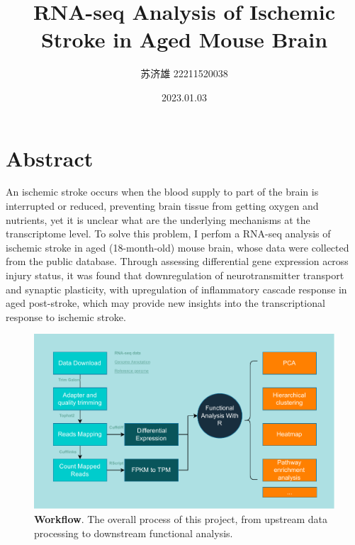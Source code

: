 \documentclass[
  a4paper,
]{article}
\title{RNA-seq Analysis of Ischemic Stroke in Aged Mouse Brain}
\author{苏济雄 22211520038}
\date{2023.01.03}
\renewcommand*\contentsname{Table of contents}
\newcommand\contentsname{Table of contents}
\begin{document}
\maketitle
\ifdefined\Shaded\renewenvironment{Shaded}{\begin{tcolorbox}[colback={shadecolor}, boxrule=0pt, breakable, frame hidden, enhanced]}{\end{tcolorbox}}\fi

\renewcommand*\contentsname{Contents}
{
\hypersetup{linkcolor=}
\setcounter{tocdepth}{3}
\tableofcontents
}
\hypertarget{abstract}{%
\section{Abstract}\label{abstract}}

An ischemic stroke occurs when the blood supply to part of the brain is
interrupted or reduced, preventing brain tissue from getting oxygen and
nutrients, yet it is unclear what are the underlying mechanisms at the
transcriptome level. To solve this problem, I perfom a RNA-seq analysis
of ischemic stroke in aged (18-month-old) mouse brain, whose data were
collected from the public database. Through assessing differential gene
expression across injury status, it was found that downregulation of
neurotransmitter transport and synaptic plasticity, with upregulation of
inflammatory cascade response in aged post-stroke, which may provide new
insights into the transcriptional response to ischemic stroke.

\begin{figure}[H]

{\centering \includegraphics{./figure/Figure-1.pipeline.pdf}

}

\caption{\textbf{Workflow}. The overall process of this project, from
upstream data processing to downstream functional analysis.}

\end{figure}
\end{document}
